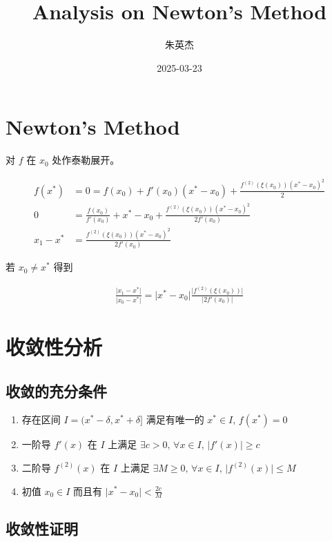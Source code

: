 \documentclass[12pt,a4paper]{ctexart}
\title{Analysis on Newton's Method}
\author{朱英杰}
\date{2025-03-23}
\begin{document}
\maketitle

\section{Newton's Method}

对 $f$ 在 $x_0$ 处作泰勒展开。

\begin{align*}
f(x^*) &= 0 = f(x_0) + f'(x_0)(x^* - x_0) + \frac{f^{(2)}(\xi(x_0))(x^* - x_0)^2}{2} \\
0 &= \frac{f(x_0)}{f'(x_0)} + x^* - x_0 + \frac{f^{(2)}(\xi(x_0))(x^* - x_0)^2}{2f'(x_0)} \\
x_{1} - x^*&= \frac{f^{(2)}(\xi(x_0))(x^* - x_0)^2}{2f'(x_0)}
\end{align*}

若 $x_0 \ne x^*$ 得到

\begin{align*}
\frac{\lvert x_1 - x^* \rvert }{\lvert x_0 - x^* \rvert}  = \lvert x^* - x_0 \rvert \frac{\lvert f^{(2)}(\xi(x_0)) \rvert}{ \lvert 2f'(x_0) \rvert}
\end{align*}


\section{收敛性分析}

\subsection{收敛的充分条件}

\begin{enumerate}
    \item 存在区间 $I = (x^* - \delta, x^* + \delta]$ 满足有唯一的 $ x^* \in I,\, f(x^*) = 0$
    \item 一阶导 $f'(x)$ 在 $I$ 上满足 $\exists c > 0,\, \forall x \in I,\, \lvert f'(x) \rvert \ge c$
    \item 二阶导 $f^{(2)}(x)$ 在 $I$ 上满足 $\exists M \ge 0,\, \forall x \in I,\, \lvert f^{(2)}(x) \rvert \le M$
    \item 初值 $x_0 \in I$ 而且有 $\lvert x^* - x_0 \rvert < \frac{2c}{M}$
\end{enumerate}


\subsection{收敛性证明}
\end{document}
